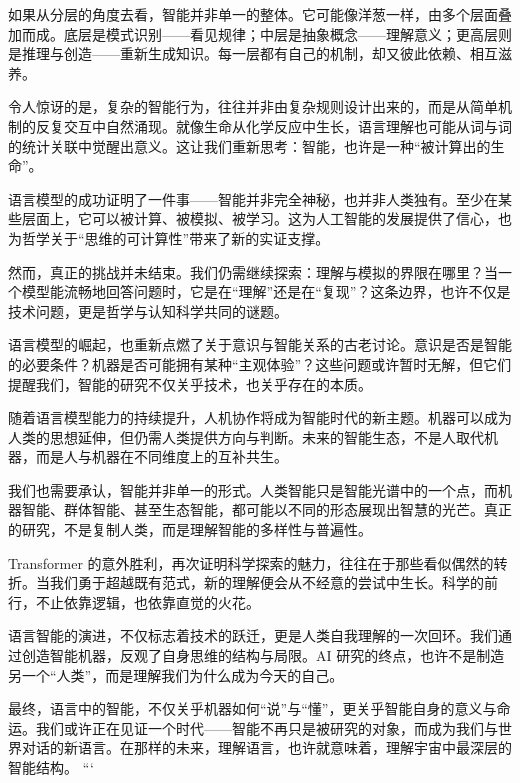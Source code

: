 如果从分层的角度去看，智能并非单一的整体。它可能像洋葱一样，由多个层面叠加而成。底层是模式识别——看见规律；中层是抽象概念——理解意义；更高层则是推理与创造——重新生成知识。每一层都有自己的机制，却又彼此依赖、相互滋养。

令人惊讶的是，复杂的智能行为，往往并非由复杂规则设计出来的，而是从简单机制的反复交互中自然涌现。就像生命从化学反应中生长，语言理解也可能从词与词的统计关联中觉醒出意义。这让我们重新思考：智能，也许是一种“被计算出的生命”。

语言模型的成功证明了一件事——智能并非完全神秘，也并非人类独有。至少在某些层面上，它可以被计算、被模拟、被学习。这为人工智能的发展提供了信心，也为哲学关于“思维的可计算性”带来了新的实证支撑。

然而，真正的挑战并未结束。我们仍需继续探索：理解与模拟的界限在哪里？当一个模型能流畅地回答问题时，它是在“理解”还是在“复现”？这条边界，也许不仅是技术问题，更是哲学与认知科学共同的谜题。

语言模型的崛起，也重新点燃了关于意识与智能关系的古老讨论。意识是否是智能的必要条件？机器是否可能拥有某种“主观体验”？这些问题或许暂时无解，但它们提醒我们，智能的研究不仅关乎技术，也关乎存在的本质。

随着语言模型能力的持续提升，人机协作将成为智能时代的新主题。机器可以成为人类的思想延伸，但仍需人类提供方向与判断。未来的智能生态，不是人取代机器，而是人与机器在不同维度上的互补共生。

我们也需要承认，智能并非单一的形式。人类智能只是智能光谱中的一个点，而机器智能、群体智能、甚至生态智能，都可能以不同的形态展现出智慧的光芒。真正的研究，不是复制人类，而是理解智能的多样性与普遍性。

Transformer 的意外胜利，再次证明科学探索的魅力，往往在于那些看似偶然的转折。当我们勇于超越既有范式，新的理解便会从不经意的尝试中生长。科学的前行，不止依靠逻辑，也依靠直觉的火花。

语言智能的演进，不仅标志着技术的跃迁，更是人类自我理解的一次回环。我们通过创造智能机器，反观了自身思维的结构与局限。AI 研究的终点，也许不是制造另一个“人类”，而是理解我们为什么成为今天的自己。

最终，语言中的智能，不仅关乎机器如何“说”与“懂”，更关乎智能自身的意义与命运。我们或许正在见证一个时代——智能不再只是被研究的对象，而成为我们与世界对话的新语言。在那样的未来，理解语言，也许就意味着，理解宇宙中最深层的智能结构。
```
